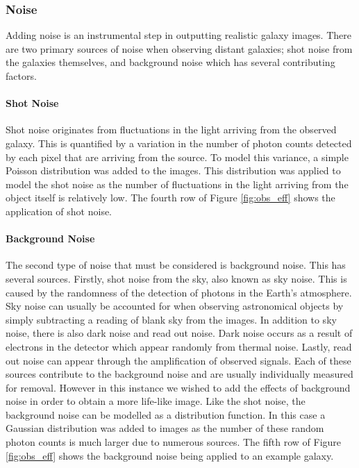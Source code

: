 \documentclass[fleqn,usenatbib]{mnras}
\begin{document}
\subsubsection{Noise}
\label{sec:noise(all)}
Adding noise is an instrumental step in outputting realistic galaxy images. There are two primary sources of noise when observing distant galaxies; shot noise from the galaxies themselves, and background noise which has several contributing factors.

\paragraph{Shot Noise} \label{sec:shot}
Shot noise originates from fluctuations in the light arriving from the observed galaxy. This is quantified by a variation in the number of photon counts detected by each pixel that are arriving from the source. To model this variance, a simple Poisson distribution was added to the images. This distribution was applied to model the shot noise as the number of fluctuations in the light arriving from the object itself is relatively low. The fourth row of Figure \ref{fig:obs_eff} shows the application of shot noise. 

\paragraph{Background Noise} \label{sec:background}
The second type of noise that must be considered is background noise. This has several sources. Firstly, shot noise from the sky, also known as sky noise. This is caused by the randomness of the detection of photons in the Earth's atmosphere. Sky noise can usually be accounted for when observing astronomical objects by simply subtracting a reading of blank sky from the images. In addition to sky noise, there is also dark noise and read out noise. Dark noise occurs as a result of electrons in the detector which appear randomly from thermal noise. Lastly, read out noise can appear through the amplification of observed signals. 
Each of these sources contribute to the background noise and are usually individually measured for removal. However in this instance we wished to add the effects of background noise in order to obtain a more life-like image. Like the shot noise, the background noise can be modelled as a distribution function. In this case a Gaussian distribution was added to images as the number of these random photon counts is much larger due to numerous sources. The fifth row of Figure \ref{fig:obs_eff} shows the background noise being applied to an example galaxy.
\end{document}
